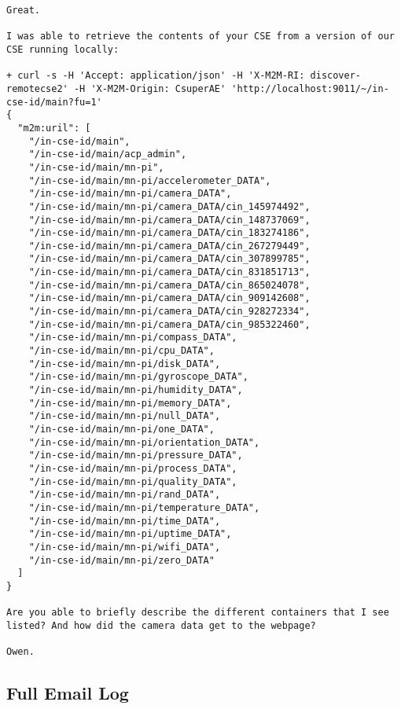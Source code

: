 \begin{lstlisting}
Great.
 
I was able to retrieve the contents of your CSE from a version of our CSE running locally:
 
+ curl -s -H 'Accept: application/json' -H 'X-M2M-RI: discover-remotecse2' -H 'X-M2M-Origin: CsuperAE' 'http://localhost:9011/~/in-cse-id/main?fu=1'
{
  "m2m:uril": [
    "/in-cse-id/main",
    "/in-cse-id/main/acp_admin",
    "/in-cse-id/main/mn-pi",
    "/in-cse-id/main/mn-pi/accelerometer_DATA",
    "/in-cse-id/main/mn-pi/camera_DATA",
    "/in-cse-id/main/mn-pi/camera_DATA/cin_145974492",
    "/in-cse-id/main/mn-pi/camera_DATA/cin_148737069",
    "/in-cse-id/main/mn-pi/camera_DATA/cin_183274186",
    "/in-cse-id/main/mn-pi/camera_DATA/cin_267279449",
    "/in-cse-id/main/mn-pi/camera_DATA/cin_307899785",
    "/in-cse-id/main/mn-pi/camera_DATA/cin_831851713",
    "/in-cse-id/main/mn-pi/camera_DATA/cin_865024078",
    "/in-cse-id/main/mn-pi/camera_DATA/cin_909142608",
    "/in-cse-id/main/mn-pi/camera_DATA/cin_928272334",
    "/in-cse-id/main/mn-pi/camera_DATA/cin_985322460",
    "/in-cse-id/main/mn-pi/compass_DATA",
    "/in-cse-id/main/mn-pi/cpu_DATA",
    "/in-cse-id/main/mn-pi/disk_DATA",
    "/in-cse-id/main/mn-pi/gyroscope_DATA",
    "/in-cse-id/main/mn-pi/humidity_DATA",
    "/in-cse-id/main/mn-pi/memory_DATA",
    "/in-cse-id/main/mn-pi/null_DATA",
    "/in-cse-id/main/mn-pi/one_DATA",
    "/in-cse-id/main/mn-pi/orientation_DATA",
    "/in-cse-id/main/mn-pi/pressure_DATA",
    "/in-cse-id/main/mn-pi/process_DATA",
    "/in-cse-id/main/mn-pi/quality_DATA",
    "/in-cse-id/main/mn-pi/rand_DATA",
    "/in-cse-id/main/mn-pi/temperature_DATA",
    "/in-cse-id/main/mn-pi/time_DATA",
    "/in-cse-id/main/mn-pi/uptime_DATA",
    "/in-cse-id/main/mn-pi/wifi_DATA",
    "/in-cse-id/main/mn-pi/zero_DATA"
  ]
}
 
Are you able to briefly describe the different containers that I see listed? And how did the camera data get to the webpage?
 
Owen.
\end{lstlisting}

\subsection*{Full Email Log}

